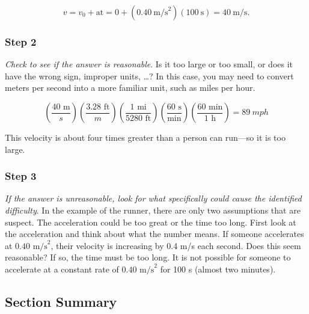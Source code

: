 \documentclass[
]{book}
\begin{document}
\leavevmode{}%
\[{{{{v = {v_{0} + \text{at}}} = {0 + \left( {0\text{.}\text{40}\ \text{m/s}^{2}} \right)}}{\left( {\text{100}\ \text{s}} \right) = \text{40}}\ \text{m/s}}.}{}\]

\hypertarget{fs-id2525779}{}
\hypertarget{step-2-1}{%
\subsubsection{Step 2}\label{step-2-1}}

\emph{Check to see if the answer is reasonable}. Is it too large or too
small, or does it have the wrong sign, improper units, \ldots? In this
case, you may need to convert meters per second into a more familiar
unit, such as miles per hour.

\leavevmode{}%
\[\left( \frac{\text{40\ m}}{s} \right)\left( \frac{\text{3.28\ ft}}{m} \right)\left( \frac{\text{1\ mi}}{\text{5280\ ft}} \right)\left( \frac{\text{60\ s}}{\text{min}} \right){\left( \frac{\text{60\ min}}{\text{1\ h}} \right) = 89\ mph}\]

This velocity is about four times greater than a person can run---so it
is too large.

\hypertarget{fs-id4130945}{}
\hypertarget{step-3-1}{%
\subsubsection{Step 3}\label{step-3-1}}

\emph{If the answer is unreasonable, look for what specifically could cause
the identified difficulty}. In the example of the runner, there are only
two assumptions that are suspect. The acceleration could be too great or
the time too long. First look at the acceleration and think about what
the number means. If someone accelerates at
\({0\text{.}\text{40\ m/s}^{2}}{}\), their velocity is increasing by 0.4
m/s each second. Does this seem reasonable? If so, the time must be too
long. It is not possible for someone to accelerate at a constant rate of
\({0\text{.}\text{40\ m/s}^{2}}{}\) for 100 s (almost two minutes).

\hypertarget{fs-id1602384-summary}{}
\hypertarget{section-summary-5}{%
\subsection{Section Summary}\label{section-summary-5}}
\end{document}
